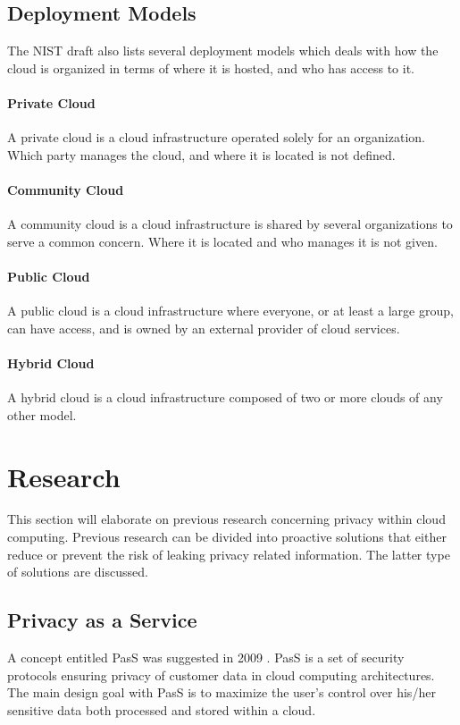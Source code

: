 \documentclass[pdftex,english,10pt,b5paper,twoside]{book}
\begin{document}
\subsection{Deployment Models}

The \ac{NIST} draft \cite{cloud_nistdef} also lists several deployment models
which deals with how the cloud is organized in terms of where it is hosted, and
who has access to it.

\paragraph{Private Cloud} A private cloud is a cloud infrastructure operated
solely for an organization. Which party manages the cloud, and where it is
located is not defined.

\paragraph{Community Cloud} A community cloud is a cloud infrastructure is
shared by several organizations to serve a common concern. Where it is located
and who manages it is not given.

\paragraph{Public Cloud} A public cloud is a cloud infrastructure where
everyone, or at least a large group, can have access, and is owned by an external
provider of cloud services.

\paragraph{Hybrid Cloud} A hybrid cloud is a cloud infrastructure composed of
two or more clouds of any other model.

\section{Research}

This section will elaborate on previous research concerning privacy within cloud
computing. Previous research can be divided into proactive solutions that
either reduce or prevent the risk of leaking privacy related information. The
latter type of solutions are discussed.

\subsection{Privacy as a Service}
A concept entitled \ac{PasS} was suggested in 2009
\cite{PasS}. PasS is a set of security protocols ensuring privacy of customer
data in cloud computing architectures. The main design goal with PasS is to
maximize the user's control over his/her sensitive data both processed and stored
within a cloud.
\end{document}

